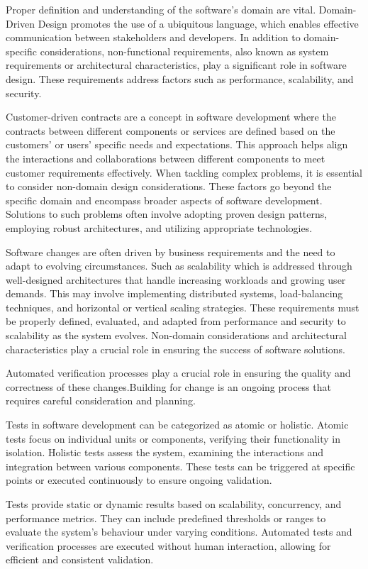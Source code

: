 \documentclass[main.tex]{subfiles}
\begin{document}
Proper definition and understanding of the software's domain are vital. Domain-Driven Design promotes the use of a ubiquitous language, which enables effective communication between stakeholders and developers. In addition to domain-specific considerations, non-functional requirements, also known as system requirements or architectural characteristics, play a significant role in software design. These requirements address factors such as performance, scalability, and security.


Customer-driven contracts are a concept in software development where the contracts between different components or services are defined based on the customers' or users' specific needs and expectations. This approach helps align the interactions and collaborations between different components to meet customer requirements effectively. When tackling complex problems, it is essential to consider non-domain design considerations. These factors go beyond the specific domain and encompass broader aspects of software development. Solutions to such problems often involve adopting proven design patterns, employing robust architectures, and utilizing appropriate technologies.

Software changes are often driven by business requirements and the need to adapt to evolving circumstances. Such as scalability which is addressed through well-designed architectures that handle increasing workloads and growing user demands. This may involve implementing distributed systems, load-balancing techniques, and horizontal or vertical scaling strategies. These requirements must be properly defined, evaluated, and adapted from performance and security to scalability as the system evolves. Non-domain considerations and architectural characteristics play a crucial role in ensuring the success of software solutions.


Automated verification processes play a crucial role in ensuring the quality and correctness of these changes.Building for change is an ongoing process that requires careful consideration and planning.

Tests in software development can be categorized as atomic or holistic. Atomic tests focus on individual units or components, verifying their functionality in isolation. Holistic tests assess the system, examining the interactions and integration between various components. These tests can be triggered at specific points or executed continuously to ensure ongoing validation.

Tests provide static or dynamic results based on scalability, concurrency, and performance metrics. They can include predefined thresholds or ranges to evaluate the system's behaviour under varying conditions. Automated tests and verification processes are executed without human interaction, allowing for efficient and consistent validation.
\end{document}
